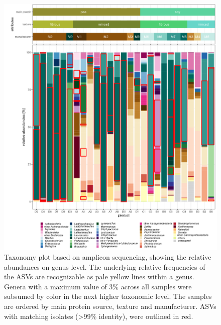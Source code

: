 \documentclass[preprint,3p,
a4paper]{elsarticle} %
\begin{document}
\begin{figure}

{\centering \includegraphics[width=1\linewidth]{Fig2_3percent} 

}

\caption{\label{fig2} Taxonomy plot based on amplicon sequencing, showing the relative abundances on genus level. The underlying relative frequencies of the ASVs are recognizable as pale yellow lines within a genus. Genera with a maximum value of 3\% across all samples were subsumed by color in the next higher taxonomic level.  The samples are ordered by main protein source, texture and manufacturer. ASVs with matching isolates (>99\% identity), were outlined in red.}\label{fig:fig2}
\end{figure}
\end{document}
